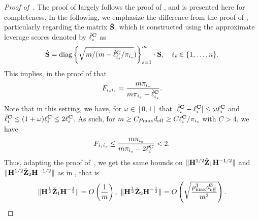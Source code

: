 \documentclass[11pt,a4paper]{article}
\begin{document}
\begin{proof}[Proof of~]
The proof of  largely follows the proof of , and is presented here for completeness. 
In the following, we emphasize the difference from the proof of , particularly regarding the matrix $\check\S$,  which is constructed using the approximate leverage scores denoted by $\check \ell^{\C}_i$ as
 \begin{align*}
  \check\S =\diag \left\{\sqrt{m/(m-\check \ell^{\C}_{i_s}/\pi_{i_s}}) \right\}^m_{s=1}\cdot\S, \quad i_s\in \{1,\ldots,n\}.
\end{align*}
This implies, in the proof of  that
\begin{align}\label{eq:F_ii_approxi_lev}
    F_{i_si_s}= \frac{m\pi_{i_s}}{ m\pi_{i_s} - \check\ell_{i_s}^\C}.
\end{align}
Note that in this setting, we have, for $\omega\in[0,1]$ that $| \check \ell^{\C}_{i}-\ell^\C_{i}|\leq \omega\ell^\C_{i} $ and $\check \ell^{\C}_{i} \leq (1+\omega)\ell^\C_{i}\leq 2 \ell^\C_{i}$.
As such, for $m \geq C \rho_{\max} d_{\eff} \geq C \ell^\C_{i}/\pi_{i_s}$ with $C> 4$, we have
 \begin{align}%
    F_{i_si_s} \leq  \frac{m\pi_{i_s}}{ m\pi_{i_s} - 2 \ell^\C_{i}}<2.\nonumber
\end{align}
Thus, adapting the proof of~, we get the same bounds on $\|\H^{1/2}\check{\Z}_1\H^{-1/2}\|$ and $ \|\H^{1/2}\check{\Z}_2\H^{-1/2}\|$ as in  , that is
\begin{align*}
    \|\H^{\frac{1}{2}}\check{\Z}_1\H^{-\frac{1}{2}}\|= O\left(\frac{ 1}{m}\right),~    \|\H^{\frac{1}{2}}\check{\Z}_2\H^{-\frac{1}{2}}\|= O\left(\sqrt{\frac{\rho_{\max}^3 d^3_{\eff}}{m^3}}\right).
\end{align*}



\end{proof}
\end{document}
